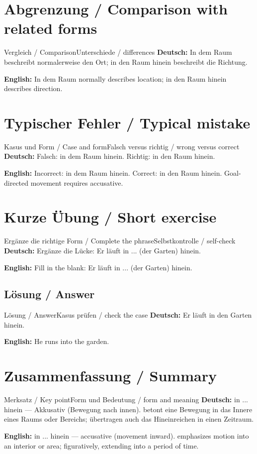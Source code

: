 \documentclass[a4paper,11pt]{article}
\newcommand{\GermanText}[1]{\textbf{Deutsch: }#1\par}
\newcommand{\EnglishText}[1]{{\small\color{SoftGray}\textbf{English: }#1\par}}
\begin{document}
\section{Abgrenzung / Comparison with related forms}
\begin{grammarentry}{Vergleich / Comparison}{Unterschiede / differences}
\GermanText{In dem Raum beschreibt normalerweise den Ort; in den Raum hinein beschreibt die Richtung.}
\EnglishText{In dem Raum normally describes location; in den Raum hinein describes direction.}
\end{grammarentry}
\section{Typischer Fehler / Typical mistake}
\begin{grammarentry}{Kasus und Form / Case and form}{Falsch versus richtig / wrong versus correct}
\GermanText{Falsch: in dem Raum hinein. Richtig: in den Raum hinein.}
\EnglishText{Incorrect: in dem Raum hinein. Correct: in den Raum hinein. Goal-directed movement requires accusative.}
\end{grammarentry}
\section{Kurze Übung / Short exercise}
\begin{grammarentry}{Ergänze die richtige Form / Complete the phrase}{Selbstkontrolle / self-check}
\GermanText{Ergänze die Lücke: Er läuft in ... (der Garten) hinein.}
\EnglishText{Fill in the blank: Er läuft in ... (der Garten) hinein.}
\end{grammarentry}
\subsection{Lösung / Answer}
\begin{grammarentry}{Lösung / Answer}{Kasus prüfen / check the case}
\GermanText{Er läuft in den Garten hinein.}
\EnglishText{He runs into the garden.}
\end{grammarentry}
\section{Zusammenfassung / Summary}
\begin{grammarentry}{Merksatz / Key point}{Form und Bedeutung / form and meaning}
\GermanText{in ... hinein — Akkusativ (Bewegung nach innen). betont eine Bewegung in das Innere eines Raums oder Bereichs; übertragen auch das Hineinreichen in einen Zeitraum.}
\EnglishText{in ... hinein — accusative (movement inward). emphasizes motion into an interior or area; figuratively, extending into a period of time.}
\end{grammarentry}
\end{document}
